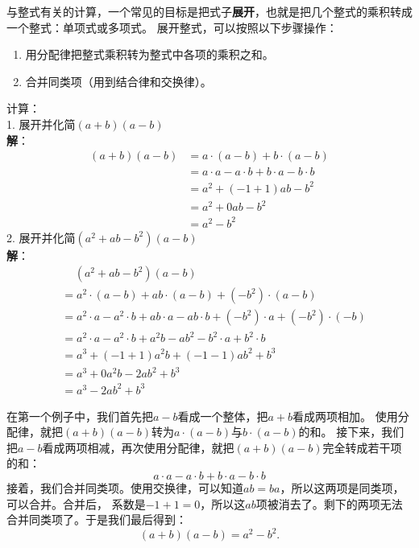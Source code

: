 \documentclass[12pt,UTF8,fontset=none]{ctexbook}
\begin{document}
与整式有关的计算，一个常见的目标是把式子\textbf{展开}，也就是把几个整式的乘积转成一个整式：单项式或多项式。
展开整式，可以按照以下步骤操作：
\begin{enumerate}
    \item 用分配律把整式乘积转为整式中各项的乘积之和。
    \item 合并同类项（用到结合律和交换律）。
\end{enumerate}
\begin{ex}\label{ex:5-0-0}
    计算：\\
    1. 展开并化简$(a + b)(a - b)$\\
    \textbf{解}：
    \begin{align*}
        (a + b)(a - b) &= a\cdot (a - b) + b\cdot (a - b) \tag{分配律展开} \\
        &= a\cdot a - a\cdot b + b\cdot a - b\cdot b \\
        &= a^2 + (-1 + 1)ab - b^2  \tag{合并同类项}\\
        &= a^2 + 0ab - b^2 \\
        &= a^2 - b^2 
    \end{align*}
    2. 展开并化简$(a^2 + ab - b^2)(a - b)$\\
    \textbf{解}：
    \begin{align*}
        &\quad\, (a^2 + ab - b^2)(a - b) \\
        &= a^2\cdot (a - b) + ab\cdot (a - b) + (- b^2)\cdot (a - b) \tag{分配律展开} \\
        &= a^2\cdot a - a^2\cdot b + ab\cdot a - ab\cdot b + (- b^2)\cdot a + (-b^2) \cdot (-b)  \\
        &= a^2\cdot a - a^2\cdot b + a^2b - ab^2 - b^2\cdot a + b^2 \cdot b  \\
        &= a^3 + (-1 + 1)a^2b + (-1 - 1)ab^2 + b^3 \tag{合并同类项}\\
        &= a^3 + 0a^2b - 2ab^2 + b^3 \\
        &= a^3 - 2ab^2 + b^3 
    \end{align*}
\end{ex}

在第一个例子中，我们首先把$a - b$看成一个整体，把$a + b$看成两项相加。
使用分配律，就把$(a + b)(a - b)$转为$a\cdot (a - b)$与$b\cdot (a - b)$的和。
接下来，我们把$a - b$看成两项相减，再次使用分配律，就把$(a + b)(a - b)$完全转成若干项的和：
$$ a\cdot a - a\cdot b + b\cdot a - b\cdot b$$
接着，我们合并同类项。使用交换律，可以知道$ab = ba$，所以这两项是同类项，可以合并。合并后，
系数是$-1 + 1 = 0$，所以这$ab$项被消去了。剩下的两项无法合并同类项了。于是我们最后得到：
$$(a + b)(a - b) = a^2 - b^2. $$
\end{document}
